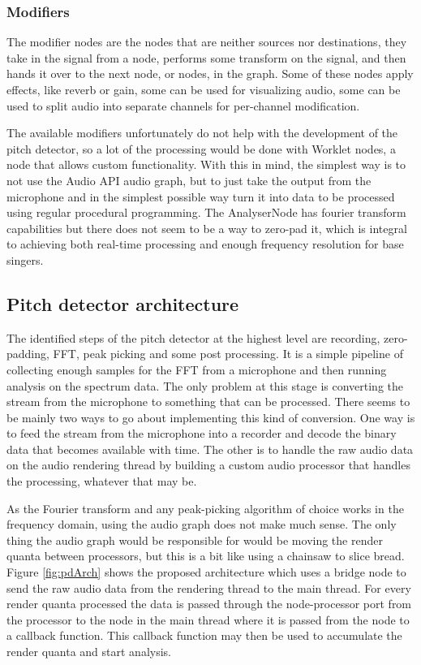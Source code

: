 \subsubsection{Modifiers} 
The modifier nodes are the nodes that are neither sources nor destinations, they take in the signal from a node, performs some transform on the signal, and then hands it over to the next node, or nodes, in the graph. Some of these nodes apply effects, like reverb or gain, some can be used for visualizing audio, some can be used to split audio into separate channels for per-channel modification.

The available modifiers unfortunately do not help with the development of the pitch detector, so a lot of the processing would be done with Worklet nodes, a node that allows custom functionality. With this in mind, the simplest way is to not use the Audio API audio graph, but to just take the output from the microphone and in the simplest possible way turn it into data to be processed using regular procedural programming. The AnalyserNode has fourier transform capabilities but there does not seem to be a way to zero-pad it, which is integral to achieving both real-time processing and enough frequency resolution for base singers. 

\subsection{Pitch detector architecture}
The identified steps of the pitch detector at the highest level are recording, zero-padding, FFT, peak picking and some post processing. It is a simple pipeline of collecting enough samples for the FFT from a microphone and then running analysis on the spectrum data. The only problem at this stage is converting the stream from the microphone to something that can be processed. There seems to be mainly two ways to go about implementing this kind of conversion. One way is to feed the stream from the microphone into a recorder and decode the binary data that becomes available with time. The other is to handle the raw audio data on the audio rendering thread by building a custom audio processor that handles the processing, whatever that may be. 

As the Fourier transform and any peak-picking algorithm of choice works in the frequency domain, using the audio graph does not make much sense. The only thing the audio graph would be responsible for would be moving the render quanta between processors, but this is a bit like using a chainsaw to slice bread. Figure \ref{fig:pdArch} shows the proposed architecture which uses a bridge node to send the raw audio data from the rendering thread to the main thread. For every render quanta processed the data is passed through the node-processor port from the processor to the node in the main thread where it is passed from the node to a callback function. This callback function may then be used to accumulate the render quanta and start analysis.

